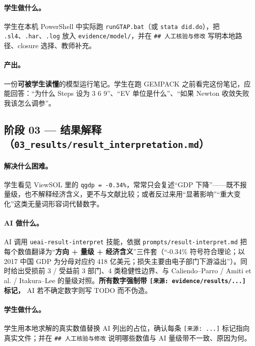 \documentclass[12pt,a4paper]{article}
\begin{document}
\paragraph{学生做什么。}学生在本机 PowerShell 中实际跑 \texttt{runGTAP.bat}（或 \texttt{stata did.do}），把 \texttt{.sl4}、\texttt{.har}、\texttt{.log} 放入 \texttt{evidence/model/}，并在 \texttt{\#\# 人工核验与修改} 写明本地路径、closure 选择、教师补充。

\paragraph{产出。}一份\textbf{可被学生读懂}的模型运行笔记。学生在跑 GEMPACK 之前看完这份笔记，应能回答：``为什么 Steps 设为 3 6 9''、``EV 单位是什么''、``如果 Newton 收敛失败我该怎么调参''。

\subsection{阶段 03 — 结果解释（\texttt{03\_results/result\_interpretation.md}）}

\paragraph{解决什么困难。}学生看见 ViewSOL 里的 \texttt{qgdp = -0.34\%}，常常只会复述``GDP 下降''——既不报量级，也不解释经济含义，更不与文献比较；或者反过来用``显著影响''``重大变化''这类无量词形容词代替数字。

\paragraph{AI 做什么。}AI 调用 \texttt{ueai-result-interpret} 技能，依据 \texttt{prompts/result-interpret.md} 把每个数值翻译为``\textbf{方向 + 量级 + 经济含义}''三件套（``-0.34\% 符号符合理论；以 2017 中国 GDP 为分母对应约 418 亿美元；损失主要由电子部门下游溢出''）。同时给出受损前 3 / 受益前 3 部门、4 类稳健性边界、与 Caliendo–Parro / Amiti et al. / Itakura–Lee 的量级对照。\textbf{所有数字强制带 \texttt{[来源: evidence/results/...]} 标记，} AI 若不确定数字则写 TODO 而不伪造。

\paragraph{学生做什么。}学生用本地求解的真实数值替换 AI 列出的占位，确认每条 \texttt{[来源: ...]} 标记指向真实文件；并在 \texttt{\#\# 人工核验与修改} 说明哪些数值与 AI 量级带不一致、原因为何。
\end{document}
